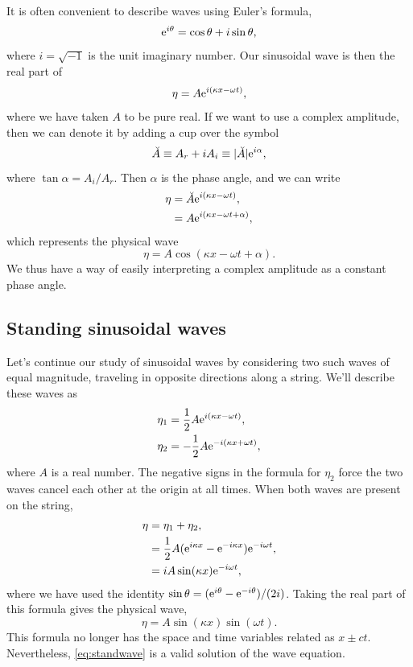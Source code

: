 \documentclass[11pt,twoside,a4paper]{article}
\begin{document}
It is often convenient to describe waves using Euler's formula,
\begin{equation}
  \label{eq:5}
  \textrm{e}^{i\theta} = \cos\theta + i\sin\theta, 
\end{equation}
where $i=\sqrt{-1}$ is the unit imaginary number.  Our sinusoidal wave
is then the real part of
\begin{displaymath}
  \eta = A\textrm{e}^{i(\kappa x - \omega t)},
\end{displaymath}
where we have taken $A$ to be pure real. If we want to use a complex
amplitude, then we can denote it by adding a cup over the symbol
\begin{equation}
  \label{eq:complexA}
  \breve{A}\equiv A_r + iA_i \equiv \vert\breve{A}\vert\textrm{e}^{i\alpha},
\end{equation}
where $\tan\alpha = A_i/A_r$.  Then $\alpha$ is the phase angle, and
we can write
\begin{align}
  \eta &= \breve{A}\textrm{e}^{i(\kappa x - \omega t)},\nonumber\\
       &= A \textrm{e}^{i(\kappa x - \omega t+\alpha)},\nonumber
\end{align}
which represents the physical wave
\begin{displaymath}
  \eta = A\cos(\kappa x - \omega t+\alpha).
\end{displaymath}
We thus have a way of easily interpreting a complex amplitude as a
constant phase angle.

\subsection{Standing sinusoidal waves}

Let's continue our study of sinusoidal waves by considering two such
waves of equal magnitude, traveling in opposite directions along a
string.  We'll describe these waves as 
\begin{align}
  \eta_1 &= \frac{1}{2}A\textrm{e}^{i(\kappa x - \omega t)},\nonumber\\
  \eta_2 &= -\frac{1}{2}A\textrm{e}^{-i(\kappa x + \omega t)},\nonumber
\end{align}
where $A$ is a real number.  The negative signs in the formula for
$\eta_2$ force the two waves cancel each other at the origin at all
times.  When both waves are present on the string,
\begin{align}
  \eta &= \eta_1 + \eta_2,\nonumber\\
       &= \frac{1}{2}A(\textrm{e}^{i\kappa x} - \textrm{e}^{-i\kappa x})\textrm{e}^{-i\omega t},\nonumber\\
       &= iA\sin(\kappa x)\textrm{e}^{-i\omega t},\nonumber
\end{align}
where we have used the identity
$\sin\theta=(\textrm{e}^{i\theta} - \textrm{e}^{-i\theta})/(2i)$. Taking the real
part of this formula gives the physical wave,
\begin{equation}
  \label{eq:standwave}
  \eta = A \sin(\kappa x)\sin(\omega t).
\end{equation}
This formula no longer has the space and time variables related as
$x\pm ct$.  Nevertheless, \autoref{eq:standwave} is a valid solution
of the wave equation.
\end{document}
